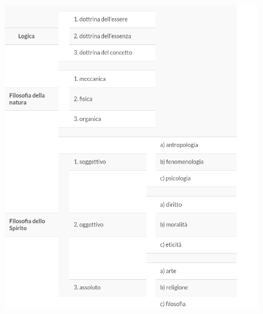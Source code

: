 \documentclass[a4paper,12pt,oneside,openany]{book}%
\begin{document}
\begin{figure}[h]
	\centering
	\includegraphics[width=0.8\linewidth]{Filosofia_Hegel}
	\caption[Schema filosofia Hegel]{}
	\label{fig:filosofiahegel}
\end{figure}
\end{document}
